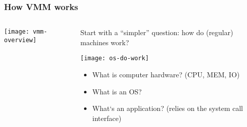 \begin{frame}[plain]
	\frametitle{How VMM works }
	
	
	
	\begin{columns}
		
		\begin{column}{.3\textwidth}
			
			\texttt{[image: vmm-overview]}
			
		\end{column}
		
		\begin{column}{.7\textwidth}
			
			Start with a “simpler” question:  how do (regular) machines work?	

			\centering
			\texttt{[image: os-do-work]}	
			
			\begin{itemize}
				\item What is computer hardware? (CPU, MEM, IO)
				\item What is an OS? 
				\item What‘s an application? (relies on the system call interface)
				
			\end{itemize} 
				
		\end{column}
		
		
	\end{columns}
	
	
\end{frame}


